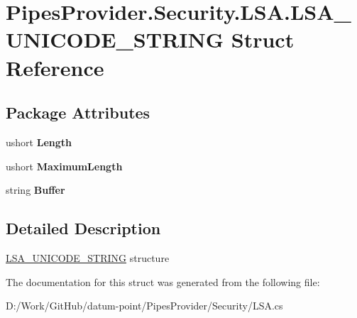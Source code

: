 \hypertarget{struct_pipes_provider_1_1_security_1_1_l_s_a_1_1_l_s_a___u_n_i_c_o_d_e___s_t_r_i_n_g}{}\section{Pipes\+Provider.\+Security.\+L\+S\+A.\+L\+S\+A\+\_\+\+U\+N\+I\+C\+O\+D\+E\+\_\+\+S\+T\+R\+I\+NG Struct Reference}
\label{struct_pipes_provider_1_1_security_1_1_l_s_a_1_1_l_s_a___u_n_i_c_o_d_e___s_t_r_i_n_g}
\subsection*{Package Attributes}
\begin{DoxyCompactItemize}
\item 
\mbox{\label{struct_pipes_provider_1_1_security_1_1_l_s_a_1_1_l_s_a___u_n_i_c_o_d_e___s_t_r_i_n_g_a47a8222b4f1eb7be1b842c0499c61dde}} 
ushort {\bfseries Length}
\item 
\mbox{\label{struct_pipes_provider_1_1_security_1_1_l_s_a_1_1_l_s_a___u_n_i_c_o_d_e___s_t_r_i_n_g_a7ab871d32b5cc7b523313d4b49ef24dd}} 
ushort {\bfseries Maximum\+Length}
\item 
\mbox{\label{struct_pipes_provider_1_1_security_1_1_l_s_a_1_1_l_s_a___u_n_i_c_o_d_e___s_t_r_i_n_g_ac1a1669b93a7749ef80d6508845233f9}} 
string {\bfseries Buffer}
\end{DoxyCompactItemize}


\subsection{Detailed Description}
\mbox{\hyperlink{struct_pipes_provider_1_1_security_1_1_l_s_a_1_1_l_s_a___u_n_i_c_o_d_e___s_t_r_i_n_g}{L\+S\+A\+\_\+\+U\+N\+I\+C\+O\+D\+E\+\_\+\+S\+T\+R\+I\+NG}} structure 

The documentation for this struct was generated from the following file\+:\begin{DoxyCompactItemize}
\item 
D\+:/\+Work/\+Git\+Hub/datum-\/point/\+Pipes\+Provider/\+Security/L\+S\+A.\+cs\end{DoxyCompactItemize}
